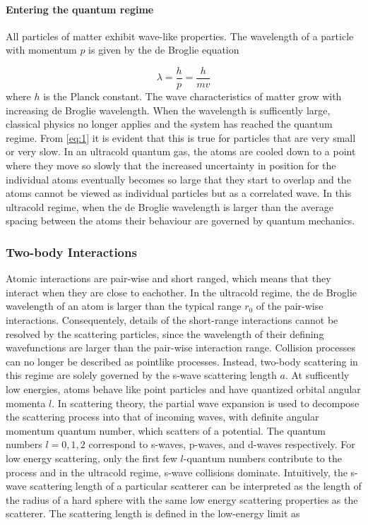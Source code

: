 \documentclass{article}
\begin{document}
\paragraph{Entering the quantum regime}
All particles of matter exhibit wave-like properties. The wavelength of a particle with momentum $p$ is given by the de Broglie equation

\begin{equation} \label{eq:1}
\lambda = \frac{h}{p} = \frac{h}{mv}
\end{equation}
where $h$ is the Planck constant. The wave characteristics of matter grow with increasing de Broglie wavelength. When the wavelength is sufficently large, classical physics no longer applies and the system has reached the quantum regime. From \eqref{eq:1} it is evident that this is true for particles that are very small or very slow. In an ultracold quantum gas, the atoms are cooled down to a point where they move so slowly that the increased uncertainty in position for the individual atoms eventually becomes so large that they start to overlap and the atoms cannot be viewed as individual particles but as a correlated wave. In this ultracold regime, when the de Broglie wavelength is larger than the average spacing between the atoms their behaviour are governed by quantum mechanics. 
 
\subsubsection{Two-body Interactions}
Atomic interactions are pair-wise and short ranged, which means that they interact when they are close to eachother. In the ultracold regime, the de Broglie wavelength of an atom is larger than the typical range $r_0$ of the pair-wise interactions. Consequentely, details of the short-range interactions cannot be resolved by the scattering particles, since the wavelength of their defining wavefunctions are larger than the pair-wise interaction range. Collision processes can no longer be described as pointlike processes. Instead, two-body scattering in this regime are solely governed by the s-wave scattering length $a$. At sufficently low energies, atoms behave like point particles and have quantized orbital angular momenta $l$. In scattering theory, the partial wave expansion is used to decompose the scattering process into that of incoming waves, with definite angular momentum quantum number, which scatters of a potential. The quantum numbers $l=0,1,2$ correspond to s-waves, p-waves, and d-waves respectively. For low energy scattering, only the first few $l$-quantum numbers contribute to the process and in the ultracold regime, s-wave collisions dominate. Intuitively, the s-wave scattering length of a particular scatterer can be interpreted as the length of the radius of a hard sphere with the same low energy scattering properties as the scatterer. The scattering length is defined in the low-energy limit as
\end{document}

